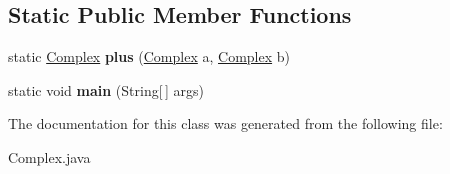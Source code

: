 \subsection*{Static Public Member Functions}
\begin{DoxyCompactItemize}
\item 
\hypertarget{class_complex_a93a5081483a5cad2da9f8bb6f9a1a6d1}{}static \hyperlink{class_complex}{Complex} {\bfseries plus} (\hyperlink{class_complex}{Complex} a, \hyperlink{class_complex}{Complex} b)\label{class_complex_a93a5081483a5cad2da9f8bb6f9a1a6d1}

\item 
\hypertarget{class_complex_a010780017cf90523d78217c89fe87d1e}{}static void {\bfseries main} (String\mbox{[}$\,$\mbox{]} args)\label{class_complex_a010780017cf90523d78217c89fe87d1e}

\end{DoxyCompactItemize}


The documentation for this class was generated from the following file\+:\begin{DoxyCompactItemize}
\item 
Complex.\+java\end{DoxyCompactItemize}
